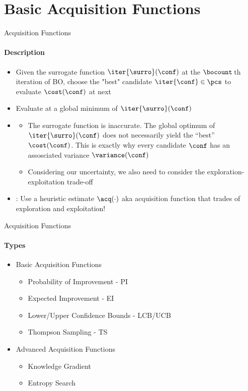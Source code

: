 \section{Basic Acquisition Functions}
\begin{frame}[c]{Acquisition Functions}
\framesubtitle{Description}
\begin{itemize}
    \item {} Given the surrogate function $\iter{\surro}(\conf)$ at the $\bocount\,$th iteration of BO, choose the "best" candidate $\iter{\conf}\in \pcs$ to evaluate $\cost(\conf)$ at next
\pause
\smallskip
    \item {} Evaluate at a global minimum of $\iter{\surro}(\conf)$ 
    \item {}
    \begin{itemize}
        \item The surrogate function is inaccurate. The global optimum of $\iter{\surro}(\conf)$ does not necessarily yield the ``best'' $\cost(\conf)$. This is exactly why every candidate $\conf$ has an assosciated variance $\variance(\conf)$
        \item Considering our uncertainty, we also need to consider the \alert{exploration-exploitation trade-off}
    \end{itemize}
\pause
\smallskip
    \pause
    \item {}: Use a heuristic estimate $\acq(\cdot)$ aka \alert{acquisition function} that trades of exploration and exploitation!
\end{itemize}

\end{frame}
\begin{frame}[c]{Acquisition Functions}
\framesubtitle{Types}
\begin{itemize}
    \item Basic Acquisition Functions
    \begin{itemize}
        \item Probability of Improvement - PI
        \item Expected Improvement - EI
        \item Lower/Upper Confidence Bounds - LCB/UCB
        \item Thompson Sampling - TS
    \end{itemize}
    \item Advanced Acquisition Functions
    \begin{itemize}
        \item Knowledge Gradient
        \item Entropy Search
    \end{itemize}
\end{itemize}

\end{frame}
